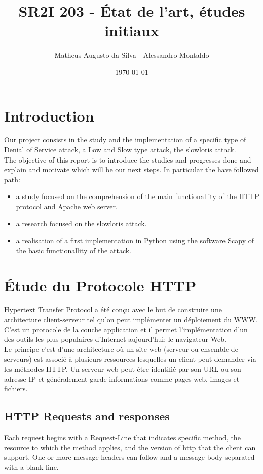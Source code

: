 \documentclass{article}
\author{Matheus Augusto da Silva - Alessandro Montaldo}
\title{\textbf{SR2I 203 - État de l'art, études initiaux}}
\date{\today}
\begin{document}
\maketitle

\section{Introduction}
Our project consists in the study and the implementation of a specific type of Denial of Service attack, a Low and Slow type attack, the slowloris attack. \\
The objective of this report is to introduce the studies and progresses done and explain and motivate which will be our next steps.
In particular the have followed path: \\

\begin{itemize}
	\item a study focused on the comprehension of the main functionallity of the HTTP protocol and Apache web server.
	\item a research focused on the slowloris attack.
	\item a realisation of a first implementation in Python using the software Scapy of the basic functionallity of the attack.
\end{itemize}


\section{Étude du Protocole HTTP}
Hypertext Transfer Protocol a été conçu avec le but de construire une architecture client-serveur tel qu'on peut implémenter un déploiement du WWW. C'est un protocole de la couche application et il permet l'implémentation d'un des outils les plus populaires d'Internet aujourd'hui: le navigateur Web. \\
Le principe c'est d'une architecture où un site web (serveur ou ensemble de serveurs) est associé à plusieurs ressources lesquelles un client peut demander via les méthodes HTTP. Un serveur web peut être identifié par son URL ou son adresse IP et généralement garde informations comme pages web, images et fichiers.

\subsection{HTTP Requests and responses}
Each request begins with a Request-Line that indicates specific method, the resource to which the method applies, and the version of http that the client can support. One or more message headers can follow and a message body separated with a blank line. \\
\end{document}
